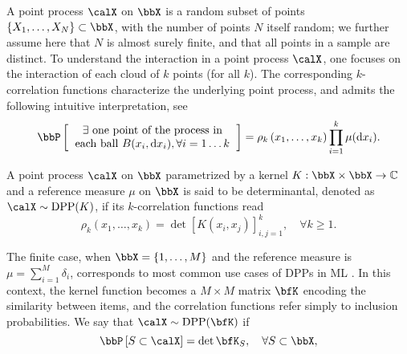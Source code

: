 \documentclass[twoside,11pt]{article}
\begin{document}
    A point process $\calX$ on $\bbX$ is a random subset of points $\lrcb{X_1, \dots, X_N} \subset \bbX$, with the number of points $N$ itself random; we further assume here that $N$ is almost surely finite, and that all points in a sample are distinct.
    To understand the interaction in a point process $\calX$, one focuses on the interaction of each cloud of $k$ points (for all $k$). 
    The corresponding $k$-correlation functions characterize the underlying point process, and admits the following intuitive interpretation, see \citep[Section 4]{MoWa04}
    \begin{equation}
    	\Proba{
    		\begin{tabular}{c}
    			$\exists$ one point of the process in\\
    			each ball $B(x_i, \diff x_i), \forall i=1\dots k $
    		\end{tabular}
    	}
    	= \rho_k\lrp{x_1,\dots,x_k}
    		\prod_{i=1}^k \mu(\diff x_i).
    \end{equation}

    
    

    A point process $\calX$ on $\bbX$ parametrized by a kernel $K:\bbX\times \bbX\rightarrow \mathbb{C}$ and a reference measure $\mu$ on $\bbX$ is said to be determinantal, denoted as $\calX\sim\DPP(K)$, if its $k$-correlation functions read
    \begin{equation}
    \label{eq:k-correlation_function_DPP}
      \rho_k(x_1,\dots,x_k)
        = \det [K(x_i, x_j)]_{i,j=1}^k,
      \quad \forall k\geq 1.
    \end{equation}

    The finite case, when $\bbX = \lrcb{1,\dots,M}$ and the reference measure is $\mu=\sum_{i=1}^M \delta_i$, corresponds to most common use cases of DPPs in ML \citep{KuTa12}.
    In this context, the kernel function becomes a $M\times M$ matrix $\bfK$ encoding the similarity between items, and the correlation functions refer simply to inclusion probabilities.
    We say that $\calX\sim \DPP(\bfK)$ if
    \begin{equation}
    \label{eq:inclusion_proba_finite}
      \Proba{S \subset \calX} = \det \bfK_S,
        \quad\forall S\subset \bbX,
    \end{equation}
\end{document}
